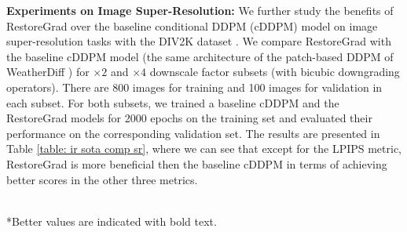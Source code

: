 \vspace{0.2cm}

\noindent\textbf{Experiments on Image Super-Resolution:}
We further study the benefits of RestoreGrad over the baseline conditional DDPM (cDDPM) model on image super-resolution tasks with the DIV2K dataset \citep{Agustsson_2017_CVPR_Workshops,Timofte_2017_CVPR_Workshops}. We compare RestoreGrad with the baseline cDDPM model (the same architecture of the patch-based DDPM of WeatherDiff \citep{ozdenizci2023restoring}) for $\times 2$ and $\times 4$ downscale factor subsets (with bicubic downgrading operators). There are 800 images for training and 100 images for validation in each subset. For both subsets, we trained a baseline cDDPM and the RestoreGrad models for 2000 epochs on the training set and evaluated their performance on the corresponding validation set. The results are presented in Table \ref{table: ir sota comp sr}, where we can see that except for the LPIPS metric, RestoreGrad is more beneficial then the baseline cDDPM in terms of achieving better scores in the other three metrics.

\begin{table}[!th]
\centering
\begin{small}{
\setlength{\tabcolsep}{5pt} %
\caption{Comparison of baseline conditional DDPM (cDDPM) and the RestoreGrad on image super-resolution tasks.}
\vspace{0.1cm}
\label{table: ir sota comp sr}
}
\\
\vspace{0.1cm}
*Better values are indicated with bold text.
\end{small}
\end{table}


